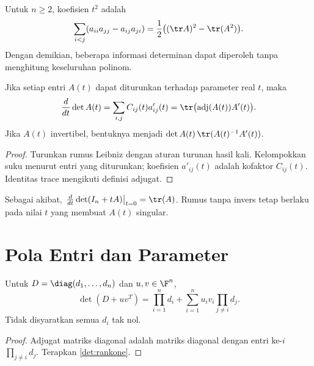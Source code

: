 Untuk $n\ge2$, koefisien $t^2$ adalah
\[
      \sum_{i<j}(a_{ii}a_{jj}-a_{ij}a_{ji})
      =\frac12\bigl((\tr A)^2-\tr(A^2)\bigr).
\]
Dengan demikian, beberapa informasi determinan dapat diperoleh tanpa
menghitung keseluruhan polinom.

\begin{prop}
      Jika setiap entri $A(t)$ dapat diturunkan terhadap parameter real $t$,
      maka
      \[
            \frac{d}{dt}\det A(t)
            =\sum_{i,j}C_{ij}(t)a'_{ij}(t)
            =\tr\bigl(\operatorname{adj}(A(t))A'(t)\bigr).
      \]
      Jika $A(t)$ invertibel, bentuknya menjadi
      $\det A(t)\,\tr(A(t)^{-1}A'(t))$.
\end{prop}
\begin{proof}
      Turunkan rumus Leibniz dengan aturan turunan hasil kali.
      Kelompokkan suku menurut entri yang diturunkan; koefisien
      $a'_{ij}(t)$ adalah kofaktor $C_{ij}(t)$.
      Identitas trace mengikuti definisi adjugat.
\end{proof}
Sebagai akibat, $\left.\frac{d}{dt}\det(I_n+tA)\right|_{t=0}=\tr(A)$.
Rumus tanpa invers tetap berlaku pada nilai $t$ yang membuat $A(t)$ singular.

\section{Pola Entri dan Parameter}
\label{det:parameter}

\begin{thm}
      \label{det:diagrankone}
      Untuk $D=\diag(d_1,\ldots,d_n)$ dan $u,v\in\F^n$,
      \[
            \det(D+uv^T)=\prod_{i=1}^n d_i
            +\sum_{i=1}^n u_iv_i\prod_{j\ne i}d_j.
      \]
      Tidak disyaratkan semua $d_i$ tak nol.
\end{thm}
\begin{proof}
      Adjugat matriks diagonal adalah matriks diagonal dengan entri ke-$i$
      $\prod_{j\ne i}d_j$. Terapkan \autoref{det:rankone}.
\end{proof}

